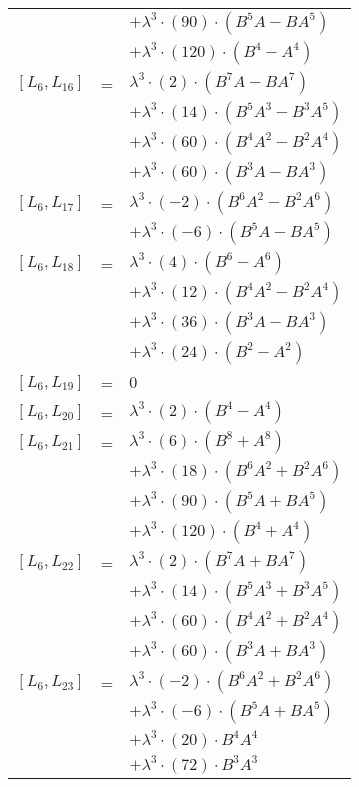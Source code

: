\documentclass{article}
\begin{document}
\begin{center}
\begin{longtable}{lll}
 & & $ + {\lambda}^3{\cdot}(90){\cdot}(B^{5}A-BA^{5})$ \\*
 & & $ + {\lambda}^3{\cdot}(120){\cdot}(B^{4}-A^{4})$ \\
$[L_{6},L_{16}]$ & = & ${\lambda}^3{\cdot}(2){\cdot}(B^{7}A-BA^{7})$ \\*
 & & $ + {\lambda}^3{\cdot}(14){\cdot}(B^{5}A^{3}-B^{3}A^{5})$ \\*
 & & $ + {\lambda}^3{\cdot}(60){\cdot}(B^{4}A^{2}-B^{2}A^{4})$ \\*
 & & $ + {\lambda}^3{\cdot}(60){\cdot}(B^{3}A-BA^{3})$ \\
$[L_{6},L_{17}]$ & = & ${\lambda}^3{\cdot}(-2){\cdot}(B^{6}A^{2}-B^{2}A^{6})$ \\*
 & & $ + {\lambda}^3{\cdot}(-6){\cdot}(B^{5}A-BA^{5})$ \\
$[L_{6},L_{18}]$ & = & ${\lambda}^3{\cdot}(4){\cdot}(B^{6}-A^{6})$ \\*
 & & $ + {\lambda}^3{\cdot}(12){\cdot}(B^{4}A^{2}-B^{2}A^{4})$ \\*
 & & $ + {\lambda}^3{\cdot}(36){\cdot}(B^{3}A-BA^{3})$ \\*
 & & $ + {\lambda}^3{\cdot}(24){\cdot}(B^{2}-A^{2})$ \\
$[L_{6},L_{19}]$ & = & $ 0 $ \\
$[L_{6},L_{20}]$ & = & ${\lambda}^3{\cdot}(2){\cdot}(B^{4}-A^{4})$ \\
$[L_{6},L_{21}]$ & = & ${\lambda}^3{\cdot}(6){\cdot}(B^{8}+A^{8})$ \\*
 & & $ + {\lambda}^3{\cdot}(18){\cdot}(B^{6}A^{2}+B^{2}A^{6})$ \\*
 & & $ + {\lambda}^3{\cdot}(90){\cdot}(B^{5}A+BA^{5})$ \\*
 & & $ + {\lambda}^3{\cdot}(120){\cdot}(B^{4}+A^{4})$ \\
$[L_{6},L_{22}]$ & = & ${\lambda}^3{\cdot}(2){\cdot}(B^{7}A+BA^{7})$ \\*
 & & $ + {\lambda}^3{\cdot}(14){\cdot}(B^{5}A^{3}+B^{3}A^{5})$ \\*
 & & $ + {\lambda}^3{\cdot}(60){\cdot}(B^{4}A^{2}+B^{2}A^{4})$ \\*
 & & $ + {\lambda}^3{\cdot}(60){\cdot}(B^{3}A+BA^{3})$ \\
$[L_{6},L_{23}]$ & = & ${\lambda}^3{\cdot}(-2){\cdot}(B^{6}A^{2}+B^{2}A^{6})$ \\*
 & & $ + {\lambda}^3{\cdot}(-6){\cdot}(B^{5}A+BA^{5})$ \\*
 & & $ + {\lambda}^3{\cdot}(20){\cdot}B^{4}A^{4}$ \\*
 & & $ + {\lambda}^3{\cdot}(72){\cdot}B^{3}A^{3}$ \\*

\end{longtable}
\end{center}
\end{document}
